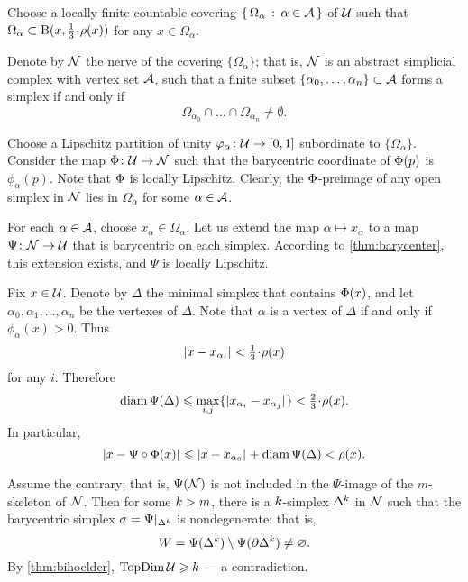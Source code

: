 Choose a locally finite countable covering $\left\{\,{\Omega_\alpha}\,:\,{\alpha\in\mathcal{A}}\,\right\}$ of $\mathcal{U}$ such that $\Omega_\alpha\subset \oBall(x,\tfrac{1}{3}\cdot\rho(x))$ for any $x\in \Omega_\alpha$. 

Denote by $\mathcal{N}$ the nerve of the covering $\{\Omega_\alpha\}$;
that is, $\mathcal{N}$ is an abstract simplicial complex with 
vertex set $\mathcal{A}$,
such that a finite subset 
$\{\alpha_0,\z\dots,\alpha_n\}\subset\IndexSet$ 
forms a simplex if and only if
\[\Omega_{\alpha_0}
\cap
\dots\cap
\Omega_{\alpha_n}\ne\emptyset.\]

Choose a Lipschitz partition of unity 
$\varphi_\alpha\colon\mathcal{U}\to [0,1]$ subordinate to $\{\Omega_\alpha\}$.
Consider the map $\Phi\colon\mathcal{U}\to \mathcal{N}$ such that the barycentric coordinate of $\Phi(p)$ is $\phi_\alpha(p)$.
Note that $\Phi$ is locally Lipschitz. 
Clearly, the $\Phi$-preimage of any open simplex in $\mathcal{N}$ lies in $\Omega_\alpha$ for some $\alpha\in\mathcal{A}$.

For each $\alpha\in\mathcal{A}$, 
choose $x_\alpha\in\Omega_\alpha$.
Let us extend the map $\alpha\mapsto x_\alpha$
to a map $\Psi\colon\mathcal{N}\to\mathcal{U}$ that is barycentric on each simplex.
According to \ref{thm:barycenter}, this extension exists, 
and $\Psi$ is locally Lipschitz.

Fix $x\in\mathcal{U}$. Denote by $\Delta$ the minimal simplex that contains $\Phi(x)$, 
and let $\alpha_0,\alpha_1,\dots,\alpha_n$ be the vertexes of $\Delta$.
Note that $\alpha$ is a vertex of $\Delta$ if and only if $\phi_{\alpha}(x)>0$.
Thus
\[\dist{x}{x_{\alpha_i}}{}<\tfrac{1}{3}\cdot\rho(x)\] 
for any $i$.
Therefore 
\[\diam\Psi(\Delta)
\le
\max_{i,j}\{\dist{x_{\alpha_i}}{x_{\alpha_j}}{}\}
<
\tfrac{2}{3}\cdot\rho(x).\]
In particular, 
\[\dist{x}{\Psi\circ\map(x)}{}\le\dist{x}{x_{\alpha_0}}{}+\diam \Psi(\Delta) <\rho(x).\]

Assume the contrary;
that is, $\Psi(\mathcal{N})$ is not included in the $\Psi$-image of the $m$-skeleton of $\mathcal{N}$.
Then for some $k>m$,
there is a $k$-simplex $\Delta^k$ in $\mathcal{N}$
such that the barycentric simplex $\sigma=\Psi|_{\Delta^k}$ is nondegenerate; 
that is, 
$$W=\Psi(\Delta^k)\setminus\Psi(\partial\Delta^k)\ne \varnothing.
$$
By \ref{thm:bihoelder}, $\mathop{\rm TopDim}\nolimits\mathcal{U}\geqslant k$ --- a contradiction.
\qeds

